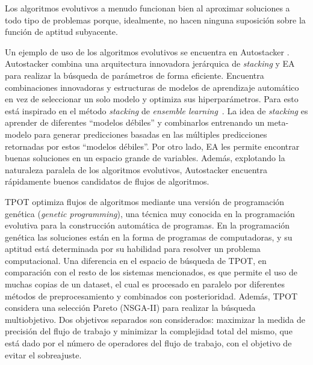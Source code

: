 Los algoritmos evolutivos a menudo funcionan bien al aproximar soluciones a todo tipo de problemas porque, idealmente, no hacen ninguna suposición sobre la función de aptitud subyacente. %

Un ejemplo de uso de los algoritmos evolutivos se encuentra en Autostacker \cite{chen2018autostacker}. Autostacker combina una arquitectura innovadora jerárquica de \textit{stacking} y EA para realizar la búsqueda de parámetros de forma eficiente. Encuentra combinaciones innovadoras y estructuras de modelos de aprendizaje automático en vez de seleccionar un solo modelo y optimiza sus hiperparámetros. Para esto está inspirado en el método \textit{stacking} de \textit{ensemble learning}~\cite{wolpert1992stacked, breiman1996stacked}. La idea de \textit{stacking} es aprender de diferentes ``modelos débiles'' y combinarlos entrenando un meta-modelo para generar predicciones basadas en las múltiples predicciones retornadas por estos ``modelos débiles''. Por otro lado, EA les permite encontrar buenas soluciones en un espacio grande de variables. Además, explotando la naturaleza paralela de los algoritmos evolutivos, Autostacker encuentra rápidamente buenos candidatos de flujos de algoritmos.

TPOT \cite{olson2019tpot} optimiza flujos de algoritmos mediante una versión de programación genética (\textit{genetic programming}), una técnica muy conocida en la programación evolutiva para la construcción automática de programas. En la programación genética las soluciones están en la forma de programas de computadoras, y su aptitud está determinada por su habilidad para resolver un problema computacional. Una diferencia en el espacio de búsqueda de TPOT, en comparación con el resto de los sistemas mencionados, es que permite el uso de muchas copias de un dataset, el cual es procesado en paralelo por diferentes métodos de preprocesamiento y combinados con posterioridad. Además, TPOT considera una selección Pareto (NSGA-II) \cite{NSGA-II} para realizar la búsqueda multiobjetivo. Dos objetivos separados son considerados: maximizar la medida de precisión del flujo de trabajo y minimizar la complejidad total del mismo, que está dado por el número de operadores del flujo de trabajo, con el objetivo de evitar el sobreajuste.

